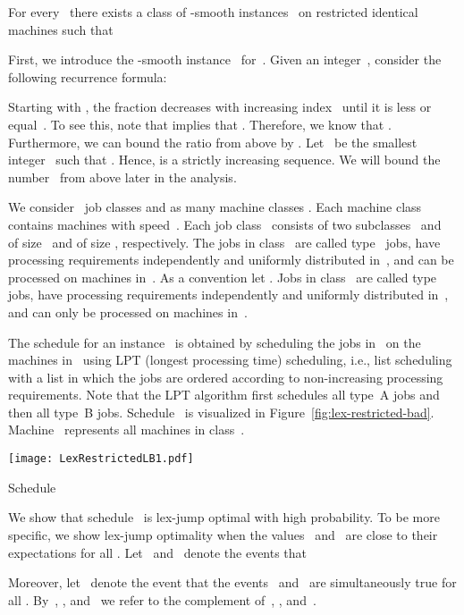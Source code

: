 \documentclass[a4paper,11pt,fleqn]{article}
\begin{document}
\begin{theorem}
\label{thm:rest-id-lj}
For every~ there exists a class of -smooth instances~ on
restricted identical machines such that

\end{theorem}

First, we introduce the -smooth instance~ for~. 
Given an integer~, consider the following recurrence formula:

Starting with , the fraction  decreases with increasing index~ until it is less or equal~.
To see this, note that  implies that . Therefore, we know that . Furthermore, we can bound the ratio  from above by .
Let~ be the smallest integer~ such that . Hence,  is a strictly increasing sequence. We will bound the number~ from above later in the analysis.

We consider~ job classes  and as many machine
classes . Each machine class~ contains  machines with speed~. Each job class~ consists of two subclasses~ and~ of size~ and of size , respectively. The jobs in class~ are called type~ jobs, have processing requirements independently and uniformly distributed in~, and can be processed on machines in~. As a convention let . Jobs in class~ are called type~ jobs, have processing requirements independently and uniformly distributed in~, and can only be processed on machines in~.

The schedule  for an instance~ is obtained by scheduling the jobs in~ on the machines in~ using LPT (longest processing time) scheduling, i.e., list scheduling with a list in which the jobs are ordered according to non-increasing processing requirements. Note that the LPT algorithm first schedules all type~A jobs and then all type~B jobs. Schedule~ is visualized in Figure~\ref{fig:lex-restricted-bad}. Machine~ represents all machines in class~.

\begin{artclfig}\newcommand{\height}{12em}
  \texttt{[image: LexRestrictedLB1.pdf]}
  \caption{Schedule }
  \label{fig:lex-restricted-bad}
\end{artclfig}


We show that schedule~ is lex-jump optimal with high probability. To be more specific, we show lex-jump optimality when the values~ and~ are close to their expectations for all . Let~ and~ denote the events that

Moreover, let~ denote the event that the events~ and~ are simultaneously true for all . By~, , and~ we refer to the complement of~, , and~.
\end{document}
